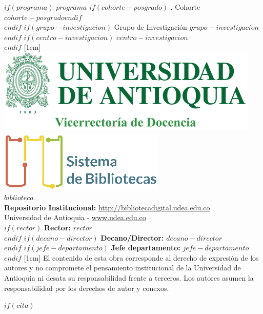 \vspace{1cm}
$if(programa)$
\noindent
{$programa$ $if(cohorte-posgrado)$ {, Cohorte $cohorte-posgrado$}$endif$}\\
$endif$
$if(grupo-investigacion)$
\noindent
{Grupo de Investigación $grupo-investigacion$}\\
$endif$
$if(centro-investigacion)$
\noindent
{$centro-investigacion$}\\
$endif$
%
[1cm]
%
\includegraphics{assets/escudo_udea_vice.png}\quad
\includegraphics{assets/sis_biblo.png}\\
{$biblioteca$}\\[1cm]
%
{\textbf{Repositorio Institucional:} \url{http://bibliotecadigital.udea.edu.co}}\\[1cm]
{Universidad de Antioquia - \url{www.udea.edu.co}}\\[0.5cm]
%
$if(rector)$
{\textbf{Rector:} $rector$}\\
$endif$
$if(decano-director)$
{\textbf{Decano/Director:} $decano-director$}\\
$endif$
$if(jefe-departamento)$
{\textbf{Jefe departamento:} $jefe-departamento$}\\
$endif$
%
[1cm]
El contenido de esta obra corresponde al derecho de expresión de los autores y no compromete el pensamiento institucional de la Universidad de Antioquia ni desata su responsabilidad frente a terceros. Los autores asumen la responsabilidad por los derechos de autor y conexos.
\newpage


$if(cita)$

\thispagestyle{empty}

